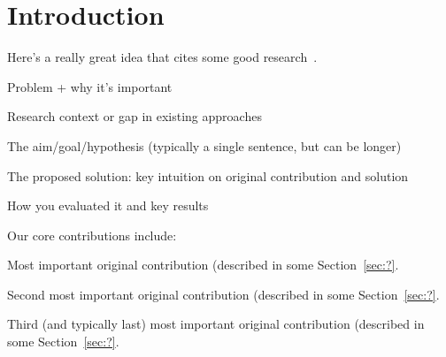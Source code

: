 \section{Introduction}

  Here's a really great idea that cites some good
  research~\cite{Dautenhahn:Nested:2015}.

  Problem + why it's important

  Research context or gap in existing approaches

  The aim/goal/hypothesis (typically a single sentence, but
     can be longer)

  The proposed solution: key intuition on original contribution and solution

  How you evaluated it and key results

  Our core contributions include: 
  \begin{itemize*}
    \item Most important original contribution (described in
      some Section~\ref{sec:?}.
    \item Second most important original contribution
      (described in some Section~\ref{sec:?}.
    \item Third (and typically last) most important original
      contribution (described in some Section~\ref{sec:?}.
  \end{itemize*}

